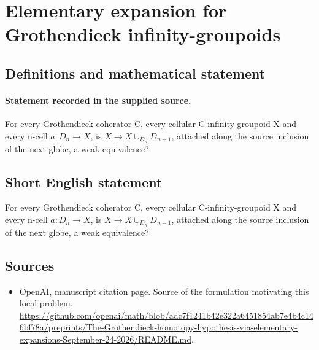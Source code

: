 \documentclass[11pt]{article}
\begin{document}
\section*{Elementary expansion for Grothendieck infinity-groupoids}\label{30007500}
\subsection{Definitions and mathematical statement}
\paragraph{Statement recorded in the supplied source.}
For every Grothendieck coherator C, every cellular C-infinity-groupoid X and every n-cell $a:D_n\to X$, is $X\to X\cup _{D_n}D_{n+1}$, attached along the source inclusion of the next globe, a weak equivalence?
\subsection{Short English statement}
For every Grothendieck coherator C, every cellular C-infinity-groupoid X and every n-cell $a:D_n\to X$, is $X\to X\cup _{D_n}D_{n+1}$, attached along the source inclusion of the next globe, a weak equivalence?
\subsection{Sources}
\begin{itemize}
\item[S1] OpenAI, manuscript citation page. Source of the formulation motivating this local problem.
\url{https://github.com/openai/math/blob/adc7f1241b42e322a6451854ab7e4b4c146bf78a/preprints/The-Grothendieck-homotopy-hypothesis-via-elementary-expansions-September-24-2026/README.md}.
\end{itemize}
\end{document}
